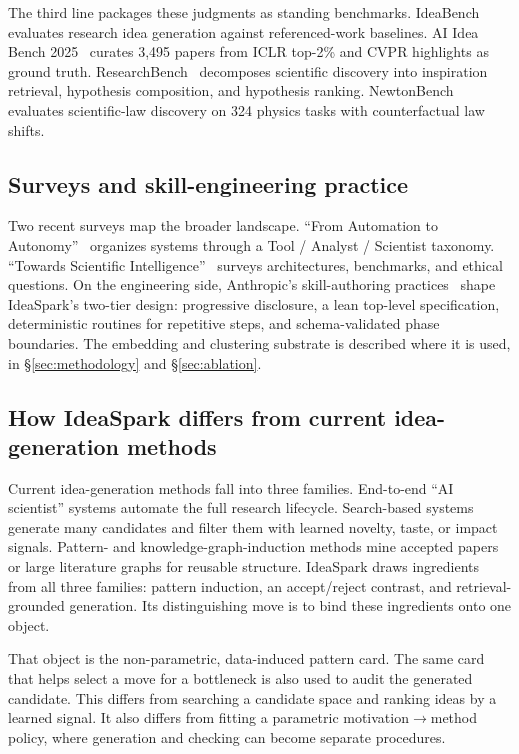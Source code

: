 \documentclass[10pt,a4paper]{article}
\begin{document}
The third line packages these judgments as standing benchmarks. IdeaBench~\cite{ideabench2024} evaluates research idea generation against referenced-work baselines. AI Idea Bench 2025~\cite{airesearchideas2025} curates 3{,}495 papers from ICLR top-2\% and CVPR highlights as ground truth. ResearchBench~\cite{researchbench2025} decomposes scientific discovery into inspiration retrieval, hypothesis composition, and hypothesis ranking. NewtonBench~\cite{newtonbench2025} evaluates scientific-law discovery on 324 physics tasks with counterfactual law shifts.

\subsection{Surveys and skill-engineering practice}
\label{subsec:related-substrate}

Two recent surveys map the broader landscape. ``From Automation to Autonomy''~\cite{from_automation_2025} organizes systems through a Tool / Analyst / Scientist taxonomy. ``Towards Scientific Intelligence''~\cite{sci_intel_survey2025} surveys architectures, benchmarks, and ethical questions. On the engineering side, Anthropic's skill-authoring practices~\cite{anthropic_skill_bp_2025} shape IdeaSpark's two-tier design: progressive disclosure, a lean top-level specification, deterministic routines for repetitive steps, and schema-validated phase boundaries. The embedding and clustering substrate is described where it is used, in \S\ref{sec:methodology} and \S\ref{sec:ablation}.

\subsection{How IdeaSpark differs from current idea-generation methods}
\label{subsec:related-diff}

Current idea-generation methods fall into three families. End-to-end ``AI scientist'' systems automate the full research lifecycle. Search-based systems generate many candidates and filter them with learned novelty, taste, or impact signals. Pattern- and knowledge-graph-induction methods mine accepted papers or large literature graphs for reusable structure. IdeaSpark draws ingredients from all three families: pattern induction, an accept/reject contrast, and retrieval-grounded generation. Its distinguishing move is to bind these ingredients onto one object.

That object is the non-parametric, data-induced pattern card. The same card that helps select a move for a bottleneck is also used to audit the generated candidate. This differs from searching a candidate space and ranking ideas by a learned signal. It also differs from fitting a parametric motivation\(\to\)method policy, where generation and checking can become separate procedures.
\end{document}

